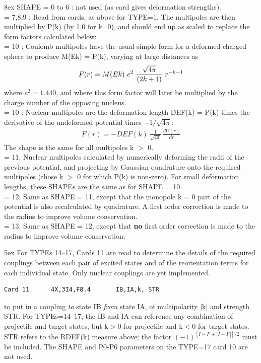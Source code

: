 \documentclass[11pt]{article}
\newcommand{\beqn}{\begin{eqnarray*}}
\newcommand{\eeqn}{\end{eqnarray*}}
\begin{document}
\hangindent 8ex
SHAPE
     = 0 to 6 : not used (as card gives deformation strengths).
\\
     = 7,8,9 : Read from cards, as above for TYPE=1.
The multipoles are then multiplied by P(k) (by 1.0 for k=0), and
should end up as scaled to replace the form factors calculated
below:
\\
= 10 : Coulomb multipoles have the usual simple form for a
deformed charged sphere to produce M(Ek) = P(k),
varying at large distances as
\beqn
      F(r) = M(Ek) ~ e^2 ~ {\sqrt{4\pi}   \over  (2k+1)}~  r^{-k-1}
\eeqn
where $e^2=1.440$, and where this form factor will later be multiplied
by the charge number of the opposing nucleus.
\\
= 10 : Nuclear multipoles are the deformation length DEF(k) = P(k)
times the derivative of the undeformed potential times $-1/\sqrt{4\pi}$:
\beqn
      F(r) = - DEF(k) ~  \frac{1}{\sqrt{4\pi}} ~ \frac{dU(r)}{dr}
\eeqn
The shape is the same for all multipoles k $>$ 0.
\\
= 11: Nuclear multipoles calculated by numerically deforming the radii
of the previous potential, and projecting by Gaussian quadrature
onto the required multipoles (those k $>$ 0 for which P(k) is non-zero).
For small deformation lengths, these SHAPEs are the same as for
SHAPE = 10.
\\
= 12: Same as SHAPE = 11, except that the monopole k = 0 part of
the potential is also recalculated by quadrature. A first order
correction is made to the radius to improve volume conservation.
\\
= 13: Same as SHAPE = 12, except that {\bf no} first order
correction is made to the radius to improve volume conservation.

\bigskip

\hangindent 5ex
For TYPEs 14--17, Cards 11 are read to determine the details of the
required couplings between each pair of excited states
and of the reorientation terms for each individual state.
Only nuclear couplings are yet implemented.
\begin{verbatim}
Card 11      4X,3I4,F8.4       IB,IA,k, STR
\end{verbatim}
to put in a coupling {\em to} state IB {\em from} state IA,
of multipolarity $|$k$|$ and strength STR. For TYPEs=14--17, the IB and IA
can reference any combination of projectile and target states,
but k$>$0 for projectile and k$<$0 for target states.
STR refers to the RDEF(k) measure above;
the factor  $(-1)^{ [I-I'+|I-I'|]/2}$ must be included.
The SHAPE and P0-P6 parameters on the TYPE=17 card 10 are not used.\\
\end{document}
